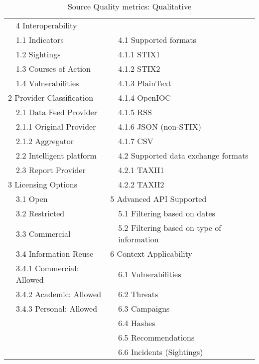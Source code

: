
\begin{table}[htbp!]
   \setlength{\arrayrulewidth}{0.1mm}
    \setlength{\tabcolsep}{5pt}
    \renewcommand{\arraystretch}{1.0}

    \centering{}
 
    \caption{Source Quality metrics: Qualitative}
    \label{table:qualitative}
    
    \begin{tabularx}{0.91\linewidth}{| p{0.5cm}|p{5.25cm}|p{0.5cm}|p{5.25cm}|} 
    
     \arrayrulecolor[HTML]{06000A}
        \hline
        \rowcolor[HTML]{5789F3} 
        \multicolumn{4}{|c|}{Qualitative based metrics} \\
        \hline
        
        \rowcolor[HTML]{ECB4E8} \multicolumn{2}{|l|}{1 Type of Information} &
      \multicolumn{2}{l|}{4 Interoperability} \\
     
     &	1.1 Indicators	& &	4.1 Supported formats \\  
     &	1.2 Sightings	& &	4.1.1 STIX1	\\ 
     &	1.3 Courses of Action	& &	4.1.2 STIX2	\\
     &	1.4 Vulnerabilities	& & 	4.1.3 PlainText	\\
     \multicolumn{2}{|l|}{ \cellcolor[HTML]{ECB4E8}2 Provider Classification} & & 4.1.4 OpenIOC \\
    &	2.1 Data Feed Provider	& &	4.1.5 RSS	\\
    &	2.1.1 Original Provider	& &	4.1.6 JSON (non-STIX)	\\
    &	2.1.2 Aggregator	& &	4.1.7 CSV	\\
    &	2.2 Intelligent platform 	& &	4.2 Supported data exchange formats	\\
    &	2.3 Report Provider	& &	4.2.1 TAXII1	\\
    
 \multicolumn{2}{|l|}{ \cellcolor[HTML]{ECB4E8}3 Licensing Options} & & 4.2.2 TAXII2\\
 
& 3.1 Open & \multicolumn{2}{|l|}{ \cellcolor[HTML]{ECB4E8}5 Advanced API Supported}\\
&	3.2 Restricted	& &	5.1 Filtering based on dates	\\
&	3.3 Commercial	& &	5.2 Filtering based on type of information	\\
& 3.4 Information  Reuse & \multicolumn{2}{|l|}{ \cellcolor[HTML]{ECB4E8} 6 Context Applicability}\\
&	3.4.1 Commercial: Allowed	& &	6.1 Vulnerabilities \\
&	3.4.2 Academic: Allowed	& &	6.2 Threats \\
&	3.4.3 Personal: Allowed	& &	6.3 Campaigns \\
&		& &	6.4 Hashes \\
&		& &	6.5 Recommendations \\
&		& &	6.6 Incidents (Sightings) \\


\end{tabularx}
\end{table}

